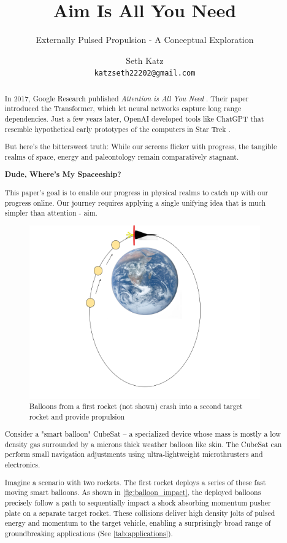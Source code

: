 \documentclass{article}
\title{Aim Is All You Need}
\subtitle{Externally Pulsed Propulsion - A Conceptual Exploration}
\author{
  Seth Katz \\
  \texttt{katzseth22202@gmail.com} \\
}
\begin{document}
\maketitle

\begin{abstract}\label{sec:abstract}
 
In 2017, Google Research published \textit{Attention is All You Need} \cite{vaswani2023attentionneed}.  Their paper introduced the Transformer, which let neural networks capture long range dependencies.   Just a few years later, OpenAI developed tools like ChatGPT \cite{chatgpt} that resemble hypothetical early prototypes of the computers in Star Trek \cite{startrek}.

But here's the bittersweet truth:  While our screens flicker with progress, the tangible realms of space, energy and paleontology remain comparatively stagnant.

\textbf{Dude, Where's My Spaceeship?}

This paper's goal is to enable our progress in physical realms to catch up with our progress online.  Our journey requires applying a single unifying idea that is much simpler than attention - aim.   

\begin{figure}[htpb]
    \centering
    \includegraphics[width=0.5\linewidth]{images/Starship_Impact_ellipse.png}
    \caption{Balloons from a first rocket (not shown) crash into a second target rocket and provide propulsion \cite{earth_image}}
    \label{fig:balloon_impact}
\end{figure}

Consider a "smart balloon" CubeSat -- a specialized device whose mass is mostly a low density gas surrounded by a microns thick weather balloon like skin. The CubeSat can perform small navigation adjustments using ultra-lightweight microthrusters and electronics.

Imagine a scenario with two rockets. The first rocket deploys a series of these fast moving smart balloons. As shown in \autoref{fig:balloon_impact}, the deployed balloons precisely follow a path to sequentially impact a shock absorbing momentum pusher plate on a separate target rocket. These collisions deliver high density jolts of pulsed energy and momentum to the target vehicle, enabling a surprisingly broad range of groundbreaking applications (See \autoref{tab:applications}). 


\end{abstract}
\end{document}
